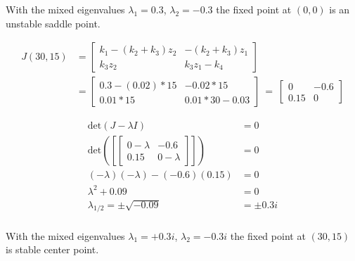\documentclass[]{scrartcl}
\begin{document}
With the mixed eigenvalues $\lambda_1 = 0.3$, $\lambda_2 = -0.3$ the fixed point at $(0,0)$ is an unstable saddle point.


\begin{center}
\begin{align*}
J(30,15) &=
\begin{bmatrix}
  k_1 - (k_2 + k_3) z_2 & - (k_2 + k_3) z_1 \\[1ex] %
  k_3 z_2 & k_3 z_1 - k_4
\end{bmatrix} \\
&= \begin{bmatrix}
  0.3 - (0.02) * 15 & -0.02 * 15 \\[1ex] %
  0.01 * 15 & 0.01 * 30 - 0.03
\end{bmatrix} ~=~
\begin{bmatrix}
  0 & -0.6 \\[1ex] %
  0.15 & 0
\end{bmatrix}
\end{align*}
\end{center}

\begin{center}
\begin{align*}
	\textrm{det}(J - \lambda I) &= 0 \\
	\textrm{det} \left( \left[ \begin{bmatrix}
  		0 - \lambda & -0.6 \\[1ex] %
  		0.15 & 0 - \lambda
	\end{bmatrix} \right] \right) &= 0 \\
	(-\lambda)(-\lambda) - (-0.6)(0.15) &= 0 \\
	\lambda^2 + 0.09 &= 0 \\
	\lambda_{1/2} = \pm \sqrt{-0.09} &= \pm 0.3i \\
\end{align*}
\end{center}


With the mixed eigenvalues $\lambda_1 = +0.3i$, $\lambda_2 = -0.3i$ the fixed point at $(30,15)$ is stable center point.
\end{document}
